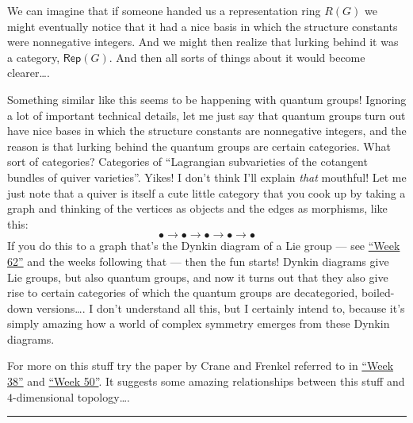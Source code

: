 \documentclass{article}
\begin{document}
We can imagine that if someone handed us a representation ring \(R(G)\)
we might eventually notice that it had a nice basis in which the
structure constants were nonnegative integers. And we might then realize
that lurking behind it was a category, \(\mathsf{Rep}(G)\). And then all
sorts of things about it would become clearer\ldots.

Something similar like this seems to be happening with quantum groups!
Ignoring a lot of important technical details, let me just say that
quantum groups turn out have nice bases in which the structure constants
are nonnegative integers, and the reason is that lurking behind the
quantum groups are certain categories. What sort of categories?
Categories of ``Lagrangian subvarieties of the cotangent bundles of
quiver varieties''. Yikes! I don't think I'll explain \emph{that}
mouthful! Let me just note that a quiver is itself a cute little
category that you cook up by taking a graph and thinking of the vertices
as objects and the edges as morphisms, like this:
\[\bullet\to\bullet\to\bullet\to\bullet\to\bullet\] If you do this to a
graph that's the Dynkin diagram of a Lie group --- see
\protect\hyperlink{week62}{``Week 62''} and the weeks following that ---
then the fun starts! Dynkin diagrams give Lie groups, but also quantum
groups, and now it turns out that they also give rise to certain
categories of which the quantum groups are decategoried, boiled-down
versions\ldots. I don't understand all this, but I certainly intend to,
because it's simply amazing how a world of complex symmetry emerges from
these Dynkin diagrams.

For more on this stuff try the paper by Crane and Frenkel referred to in
\protect\hyperlink{week38}{``Week 38''} and
\protect\hyperlink{week50}{``Week 50''}. It suggests some amazing
relationships between this stuff and \(4\)-dimensional topology\ldots.

\begin{center}\rule{0.5\linewidth}{0.5pt}\end{center}
\end{document}
